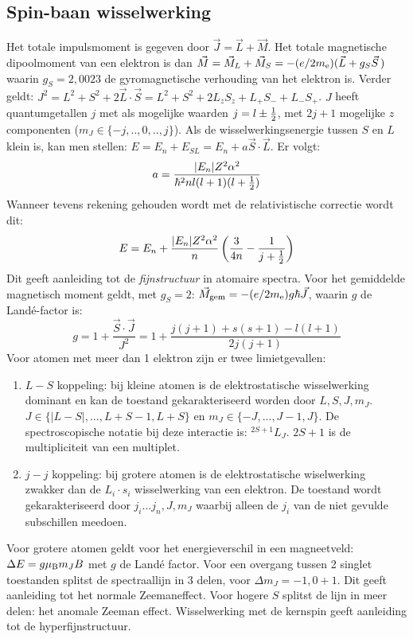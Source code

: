 \documentclass[twoside]{report}
\begin{document}
\subsection[~~Spin-baan wisselwerking]{Spin-baan wisselwerking}
Het totale impulsmoment is gegeven door $\vec{J}=\vec{L}+\vec{M}$. Het totale
magnetische dipoolmoment van een elektron is dan
$\vec{M}=\vec{M}_L+\vec{M}_S=-(e/2m_{\rm e})(\vec{L}+g_S\vec{S}\,)$ waarin
$g_S=2,0023$ de gyromagnetische verhouding van het elektron is. Verder
geldt: $J^2=L^2+S^2+2\vec{L}\cdot\vec{S}=L^2+S^2+2L_zS_z+L_+S_-+L_-S_+$.
$J$ heeft quantumgetallen $j$ met als mogelijke waarden $j=l\pm\mbox{$\frac{1}{2}$}$, met
$2j+1$ mogelijke $z$ componenten ($m_J\in\{-j,..,0,..,j\}$). Als de
wisselwerkingsenergie tussen $S$ en $L$ klein is, kan men stellen:
$E=E_n+E_{SL}=E_n+a\vec{S}\cdot\vec{L}$. Er volgt:
\[
a=\frac{|E_n|Z^2\alpha^2}{\hbar^2nl(l+1)(l+\mbox{$\frac{1}{2}$})}
\]
Wanneer tevens rekening gehouden wordt met de relativistische correctie wordt
dit:
\[
E=E_n+\frac{|E_n|Z^2\alpha^2}{n}\left(\frac{3}{4n}-\frac{1}{j+\mbox{$\frac{1}{2}$}}\right)
\]
Dit geeft aanleiding tot de {\it fijnstructuur} in atomaire spectra. Voor het
gemiddelde magnetisch moment geldt, met $g_S=2$:
$\vec{M}_{\rm gem}=-(e/2m_{\rm e})g\hbar\vec{J}$, waarin $g$ de
Land\'e-factor is:
\[
g=1+\frac{\vec{S}\cdot\vec{J}}{J^2}=1+\frac{j(j+1)+s(s+1)-l(l+1)}{2j(j+1)}
\]
Voor atomen met meer dan 1 elektron zijn er twee limietgevallen:
\begin{enumerate}
\item $L-S$ koppeling: bij kleine atomen is de elektrostatische wisselwerking
      dominant en kan de toestand gekarakteriseerd worden door $L,S,J,m_J$.
      $J\in\{|L-S|,...,L+S-1,L+S\}$ en $m_J\in\{-J,...,J-1,J\}$. De
      spectroscopische notatie bij deze interactie is: $^{2S+1}L_J$. $2S+1$
      is de multipliciteit van een multiplet.
\item $j-j$ koppeling: bij grotere atomen is de elektrostatische wiselwerking
      zwakker dan de $L_i\cdot s_i$ wisselwerking van een elektron. De
      toestand wordt gekarakteriseerd door $j_i...j_n,J,m_J$ waarbij alleen
      de $j_i$ van de niet gevulde subschillen meedoen.
\end{enumerate}
Voor grotere atomen geldt voor het energieverschil in een magneetveld:
$\Delta E=g\mu_{\rm B}m_JB$ met $g$ de Land\'e factor. Voor een overgang
tussen 2 singlet toestanden splitst de spectraallijn in 3 delen, voor
$\Delta m_J=-1,0+1$. Dit geeft aanleiding tot het normale Zeemaneffect. Voor
hogere $S$ splitst de lijn in meer delen: het anomale Zeeman effect.
\npar
Wisselwerking met de kernspin geeft aanleiding tot de hyperfijnstructuur.
\end{document}
